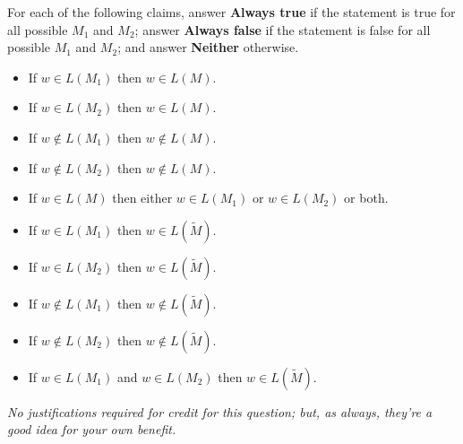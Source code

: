 \documentclass[10pt,letterpaper,unboxed,cm]{hmcpset}
\begin{document}
\begin{problem}[3.]
For each of the following claims, answer {\bf Always true} if the statement is true for all possible $M_1$
and $M_2$; answer {\bf Always false}  if the statement is false for all possible $M_1$
and $M_2$; and answer {\bf Neither} otherwise.
\begin{itemize}
\item[a.] If $w \in L(M_1)$ then $w \in L(M)$.
\item[b.] If $w \in L(M_2)$ then $w \in L(M)$.
\item[c.] If $w \notin L(M_1)$ then $w \notin L(M)$.
\item[d.] If $w \notin L(M_2)$ then $w \notin L(M)$.
\item[e.] If $w \in L(M)$ then either $w \in L(M_1)$ or $w \in L(M_2)$ or both.
\item[f.] If $w \in L(M_1)$ then $w \in L(\tilde{M})$.
\item[g.] If $w \in L(M_2)$ then $w \in L(\tilde{M})$.
\item[h.] If $w \notin L(M_1)$ then $w \notin L(\tilde{M})$.
\item[i.] If $w \notin L(M_2)$ then $w \notin L(\tilde{M})$.
\item[j.] If $w \in L(M_1)$  and $w \in L(M_2)$ then $w \in L(\tilde{M})$.
\end{itemize}


{\it No justifications required for credit for this question; but, as always, they're a good idea for your own benefit.}


\end{problem}
\end{document}

